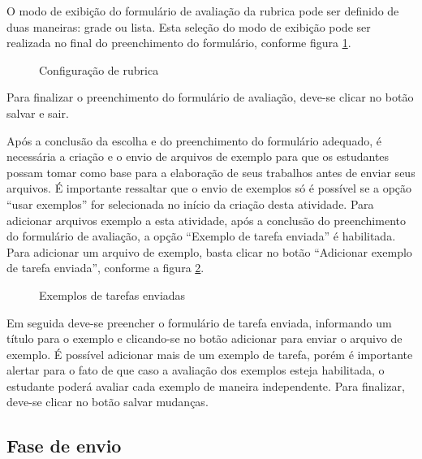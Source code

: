 O modo de exibição do formulário de avaliação da rubrica pode ser definido de duas maneiras: grade ou lista. Esta seleção do modo de exibição pode ser realizada no final do preenchimento do formulário, conforme figura \ref{fig:config_rubrica}.

\begin{figure}
 \begin{center}
  \caption{Configuração de rubrica}
  \label{fig:config_rubrica}
 \end{center}
\end{figure}

Para finalizar o preenchimento do formulário de avaliação, deve-se clicar no botão salvar e sair.

Após a conclusão da escolha e do preenchimento do formulário adequado, é necessária a criação e o envio de arquivos de exemplo para que os estudantes possam tomar como base para a elaboração de seus trabalhos antes de enviar seus arquivos. É importante ressaltar que o envio de exemplos só é possível se a opção “usar exemplos” for selecionada no início da criação desta atividade. Para adicionar arquivos exemplo a esta atividade, após a conclusão do preenchimento do formulário de avaliação, a opção “Exemplo de tarefa enviada” é habilitada. Para adicionar um arquivo de exemplo, basta clicar no botão “Adicionar exemplo de tarefa enviada”, conforme a figura \ref{fig:exe_tarefas}.

\begin{figure}
 \begin{center}
  \caption{Exemplos de tarefas enviadas}
  \label{fig:exe_tarefas}
 \end{center}
\end{figure}

Em seguida deve-se preencher o formulário de tarefa enviada, informando um título para o exemplo e clicando-se no botão adicionar para enviar o arquivo de exemplo. É possível adicionar mais de um exemplo de tarefa, porém é importante alertar para o fato de que caso a avaliação dos exemplos esteja habilitada, o estudante poderá avaliar cada exemplo de maneira independente. Para finalizar, deve-se clicar no botão salvar mudanças.

\subsection{Fase de envio}

